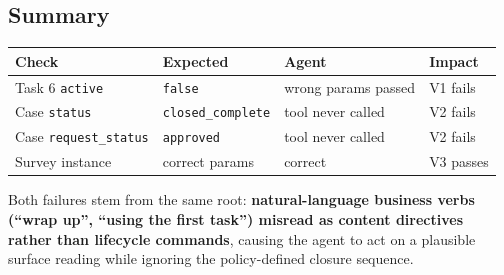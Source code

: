 \subsection{Summary}
\label{summary}

\begin{center}
\begin{tabular}{llll}
\toprule
\textbf{Check} & \textbf{Expected} & \textbf{Agent} & \textbf{Impact} \\
\midrule
Task 6 \texttt{active}        & \texttt{false}            & wrong params passed  & V1 fails \\
Case \texttt{status}          & \texttt{closed\_complete} & tool never called    & V2 fails \\
Case \texttt{request\_status} & \texttt{approved}         & tool never called    & V2 fails \\
Survey instance               & correct params            & correct              & V3 passes \\
\bottomrule
\end{tabular}
\end{center}

\medskip

Both failures stem from the same root: \textbf{natural-language business
verbs (``wrap up'', ``using the first task'') misread as content
directives rather than lifecycle commands}, causing the agent to act on
a plausible surface reading while ignoring the policy-defined closure
sequence.